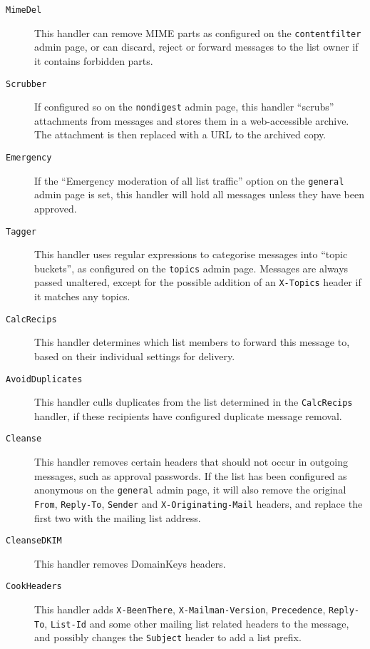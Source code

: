 \documentclass[a4]{article}
\newcommand{\hdr}[1]{\texttt{#1}}
\newcommand{\handler}[1]{\texttt{#1}}
\newcommand{\page}[1]{\nolinkurl{#1}}
\begin{document}
\begin{description}
\item[\tt MimeDel]
This handler can remove MIME parts as configured on the \page{contentfilter} admin page,
or can discard, reject or forward messages to the list owner if it contains forbidden parts.

\item[\tt Scrubber]
If configured so on the \page{nondigest} admin page,
this handler ``scrubs'' attachments from messages and stores them in a web-accessible archive.
The attachment is then replaced with a URL to the archived copy.

\item[\tt Emergency]
If the ``Emergency moderation of all list traffic'' option on the \page{general} admin page is set,
this handler will hold all messages unless they have been approved.

\item[\tt Tagger]
This handler uses regular expressions to categorise messages into ``topic buckets'', as configured on the \page{topics} admin page.
Messages are always passed unaltered, except for the possible addition of an \hdr{X-Topics} header if it matches any topics.

\item[\tt CalcRecips]
This handler determines which list members to forward this message to,
based on their individual settings for delivery.

\item[\tt AvoidDuplicates]
This handler culls duplicates from the list determined in the \handler{CalcRecips} handler,
if these recipients have configured duplicate message removal.

\item[\tt Cleanse]
This handler removes certain headers that should not occur in outgoing messages,
such as approval passwords.
If the list has been configured as anonymous on the \page{general} admin page,
it will also remove the original \hdr{From}, \hdr{Reply-To}, \hdr{Sender} and \hdr{X-Originating-Mail} headers,
and replace the first two with the mailing list address.

\item[\tt CleanseDKIM]
This handler removes DomainKeys headers.

\item[\tt CookHeaders]
This handler adds \hdr{X-BeenThere}, \hdr{X-Mailman-Version}, \hdr{Precedence}, \hdr{Reply-To}, \hdr{List-Id}
and some other mailing list related headers to the message,
and possibly changes the \hdr{Subject} header to add a list prefix.


\end{description}
\end{document}
